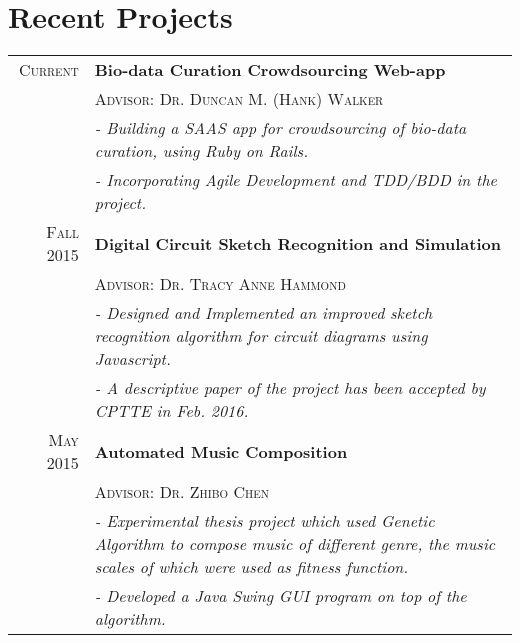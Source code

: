 \documentclass[a4paper,10pt]{article}
\begin{document}
\section{Recent Projects}
\begin{longtable}{rp{12cm}}	

    \textsc{Current}
    &\textbf{Bio-data Curation Crowdsourcing Web-app}\\
    &\textsc{Advisor: Dr. Duncan M. (Hank) Walker}\\
    &\textit{- Building a SAAS app for crowdsourcing of bio-data curation,  using Ruby on Rails.}\\
    &\textit{- Incorporating Agile Development and TDD/BDD in the project.}
    
    \\
    
    \textsc{Fall 2015}
    &\textbf{Digital Circuit Sketch Recognition and Simulation}\\
    &\textsc{Advisor: Dr. Tracy Anne Hammond}\\
    &\textit{- Designed and Implemented an improved sketch recognition algorithm for circuit diagrams using Javascript.}\\
    &\textit{- A descriptive paper of the project has been accepted by CPTTE in Feb. 2016.}
    
    \\
    
    
    \textsc{May 2015}
    &\textbf{Automated Music Composition}\\
    &\textsc{Advisor: Dr. Zhibo Chen}\\
    &\textit{- Experimental thesis project which used Genetic Algorithm to compose music of different genre, the music scales of which were used as fitness function.}\\
    &\textit{- Developed a Java Swing GUI program on top of the algorithm.}

\end{longtable}
\end{document}
